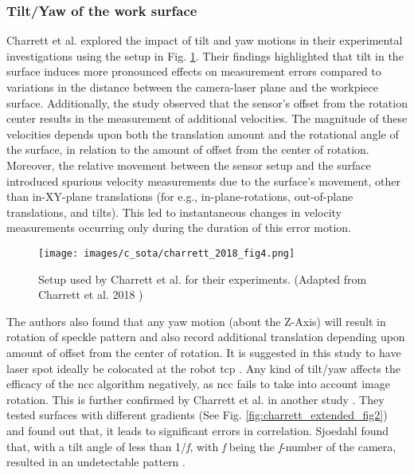     \subsubsection{Tilt/Yaw of the work surface}\label{subsubsection:tilt_yaw}
    Charrett et al. \cite{charrett_2018} explored the impact of tilt and yaw motions in their experimental investigations using the setup in Fig. \ref{fig:charrett_2018_fig4}. Their findings highlighted that tilt in the surface induces more pronounced effects on measurement errors compared to variations in the distance between the camera-laser plane and the workpiece surface. Additionally, the study observed that the sensor's offset from the rotation center results in the measurement of additional velocities. The magnitude of these velocities depends upon both the translation amount and the rotational angle of the surface, in relation to the amount of offset from the center of rotation. Moreover, the relative movement between the sensor setup and the surface introduced spurious velocity measurements due to the surface's movement, other than in-XY-plane translations (for e.g., in-plane-rotations, out-of-plane translations, and tilts). This led to instantaneous changes in velocity measurements occurring only during the duration of this error motion.

    \begin{figure}[h]
        \centering
        \texttt{[image: images/c\_sota/charrett\_2018\_fig4.png]}
        \caption{Setup used by Charrett et al. for their experiments. (Adapted from Charrett et al. 2018 \cite{charrett_2018})}
        \label{fig:charrett_2018_fig4}
    \end{figure}

    \vspace{5mm}
    \noindent The authors also found that any yaw motion (about the Z-Axis) will result in rotation of speckle pattern and also record additional translation depending upon amount of offset from the center of rotation. It is suggested in this study to have laser spot ideally be colocated at the robot \gls{tcp} \cite{charrett_2018}. Any kind of tilt/yaw affects the efficacy of the \gls{ncc} algorithm negatively, as \gls{ncc} fails to take into account image rotation. This is further confirmed by Charrett et al. in another study \cite{charrett_extended_theory}. They tested surfaces with different gradients (See Fig. \ref{fig:charrett_extended_fig2}) and found out that, it leads to significant errors in correlation. Sjoedahl found that, with a tilt angle of less than 1/\emph{f}, with \emph{f} being the \emph{f}-number of the camera, resulted in an undetectable pattern \cite{sjoedahl}.
    
